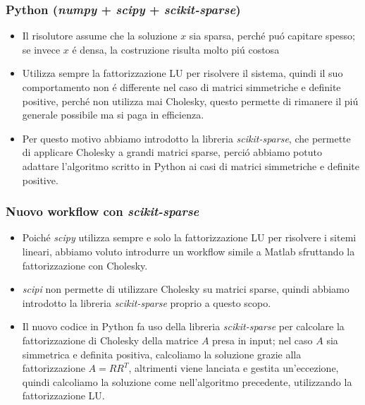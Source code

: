 \documentclass{beamer}
\begin{document}
\begin{frame}
	\frametitle{Python (\textit{numpy} + \textit{scipy} + \textit{scikit-sparse})}
	\begin{itemize}
		\item Il risolutore assume che la soluzione $x$ sia sparsa, perch\'e pu\'o capitare spesso; se invece $x$ \'e densa, la costruzione risulta molto pi\'u costosa
		\item Utilizza sempre la fattorizzazione LU per risolvere il sistema, quindi il suo comportamento non \'e differente nel caso di matrici simmetriche e definite positive, perch\'e non utilizza mai Cholesky, questo permette di rimanere il pi\'u generale possibile ma si paga in efficienza.
		\item 	Per questo motivo abbiamo introdotto la libreria \textit{scikit-sparse}, che permette di applicare Cholesky a grandi matrici sparse, perci\'o abbiamo potuto adattare l'algoritmo scritto in Python ai casi di matrici simmetriche e definite positive.
	\end{itemize}
\end{frame}

\begin{frame}
\frametitle{Nuovo workflow con \textit{scikit-sparse}}


\begin{itemize}
	\item Poich\'e \textit{scipy} utilizza sempre e solo la fattorizzazione LU per risolvere i sitemi lineari, abbiamo voluto introdurre un workflow simile a Matlab sfruttando la fattorizzazione con Cholesky.
	
	\item \textit{scipi} non permette di utilizzare Cholesky su matrici sparse, quindi abbiamo introdotto la libreria \textit{scikit-sparse} proprio a questo scopo.
	
	\item Il nuovo codice in Python fa uso della libreria \textit{scikit-sparse} per calcolare la fattorizzazione di Cholesky della matrice $A$ presa in input; nel caso $A$ sia simmetrica e definita positiva, calcoliamo la soluzione grazie alla fattorizzazione $A = RR^T$, altrimenti viene lanciata e gestita un'eccezione, quindi calcoliamo la soluzione come nell'algoritmo precedente, utilizzando la fattorizzazione LU.
\end{itemize}


\end{frame}

\end{document}
